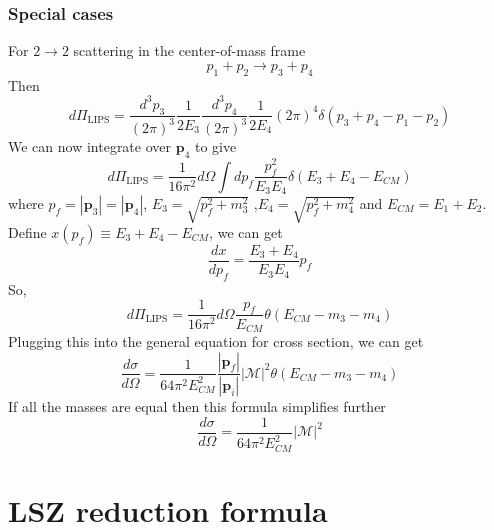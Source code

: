 \subsubsection{Special cases}
\noindent
For $2 \to 2$ scattering in the center-of-mass frame
\[p_1 + p_2 \to p_3 + p_4\]
Then
\[d\Pi_{\mathrm{LIPS}} = \frac{d^3p_3}{(2\pi)^3} \frac{1}{2E_3 } \frac{d^3p_4}{(2\pi)^3} \frac{1}{2E_4} (2\pi)^4 \delta(p_3+p_4-p_1-p_2)\]
We can now integrate over $\bm{p}_4$ to give
\[d\Pi_{\mathrm{LIPS}} = \frac{1}{16\pi^2} d\Omega \int dp_f \frac{p_f^2}{E_3 E_4} \delta(E_3+E_4 -E_{CM})\]
where $p_f = |\bm{p}_3| = |\bm{p}_4|$, $E_3 = \sqrt{p_f^2 + m_3^2}$ ,$E_4 = \sqrt{p_f^2 + m_4^2}$ and $E_{CM} = E_1 + E_2$. 
Define $x(p_f) \equiv E_3 + E_4 - E_{CM}$, we can get
\[\frac{dx}{dp_f} = \frac{E_3+E_4}{E_3 E_4}p_f\]
So,
\[d\Pi_{\mathrm{LIPS}} = \frac{1}{16\pi^2} d\Omega \frac{p_f}{E_{CM}}\theta (E_{CM} - m_3 -m_4)\]
Plugging this into the general equation for cross section, we can get
\[ \frac{d\sigma}{d\Omega} = \frac{1}{64\pi^2 E_{CM}^2} \frac{|\bm{p}_f|}{|\bm{p}_i|} |\mathcal{M}|^2 \theta (E_{CM} - m_3 -m_4) \]
If all the masses are equal then this formula simplifies further
\[\frac{d\sigma}{d\Omega} = \frac{1}{64\pi^2 E_{CM}^2} |\mathcal{M}|^2\]
\newpage

\section{LSZ reduction formula}
